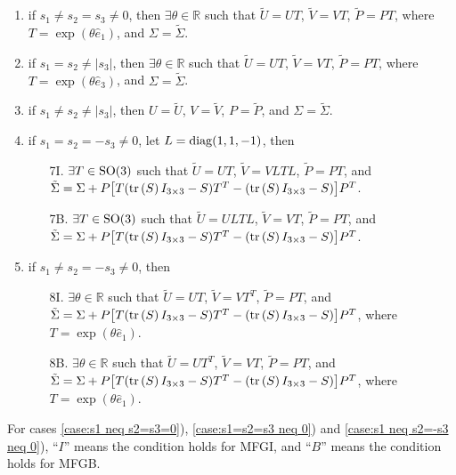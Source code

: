 \begin{theorem}
\begin{enumerate}
		\item if $s_1 \neq s_2=s_3 \neq 0$, then $\exists \theta\in\mathbb{R}$ such that $\tilde{U}=UT$, $\tilde{V}=VT$, $\tilde{P}=PT$, where $T=\exp(\theta\hat{e}_1)$, and $\Sigma=\tilde{\Sigma}$.\label{case:s1 neq s2=s3 neq 0}
		\item if $s_1=s_2 \neq |s_3|$, then $\exists \theta\in\mathbb{R}$ such that $\tilde{U}=UT$, $\tilde{V}=VT$, $\tilde{P}=PT$, where $T=\exp(\theta\hat{e}_3)$, and $\Sigma=\tilde{\Sigma}$.\label{case:s1=s2 neq |s3|}
		\item if $s_1 \neq s_2 \neq |s_3|$, then $U=\tilde{U}$, $V=\tilde{V}$, $P=\tilde{P}$, and $\Sigma=\tilde{\Sigma}$. \label{case:s1 neq s2 neq |s3|}
		\item if $s_1=s_2=-s_3 \neq 0$, let $L = \mathrm{diag}(1,1,-1)$, then \label{case:s1=s2=-s3 neq 0}
		\begin{enumerate}
			\item [7I.] $\exists T\in\mathrm{SO}(3)$ such that $\tilde{U}=UT$, $\tilde{V}=VLTL$, $\tilde{P}=PT$, and \linebreak $\tilde{\Sigma} = \Sigma + P\big[T(\mathrm{tr}\left( S \right)I_{3\times 3}-S)T^T - (\mathrm{tr}\left( S \right)I_{3\times 3}-S)\big]P^T$.
			\item [7B.] $\exists T\in\mathrm{SO}(3)$ such that  $\tilde{U}=ULTL$, $\tilde{V}=VT$, $\tilde{P}=PT$, and \linebreak $\tilde{\Sigma} = \Sigma + P\big[ T(\mathrm{tr}\left( S \right)I_{3\times 3}-S)T^T - (\mathrm{tr}\left( S \right)I_{3\times 3}-S) \big]P^T$.
		\end{enumerate}
		\item if $s_1 \neq s_2=-s_3 \neq 0$, then \label{case:s1 neq s2=-s3 neq 0}
		\begin{enumerate}
			\item [8I.] $\exists \theta\in\mathbb{R}$ such that $\tilde{U}=UT$, $\tilde{V}=VT^T$, $\tilde{P}=PT$, and $\tilde{\Sigma} = \Sigma + P\big[ T(\mathrm{tr}\left( S \right)I_{3\times 3}-S)T^T - (\mathrm{tr}\left( S \right)I_{3\times 3}-S) \big]P^T$, where $T=\exp(\theta\hat{e}_1)$.
			\item [8B.] $\exists \theta\in\mathbb{R}$ such that $\tilde{U}=UT^T$, $\tilde{V}=VT$, $\tilde{P}=PT$, and $\tilde{\Sigma} = \Sigma + P\big[ T(\mathrm{tr}\left( S \right)I_{3\times 3}-S)T^T - (\mathrm{tr}\left( S \right)I_{3\times 3}-S) \big]P^T$, where $T=\exp(\theta\hat{e}_1)$.
		\end{enumerate}
	\end{enumerate}
	For cases \ref{case:s1 neq s2=s3=0}), \ref{case:s1=s2=s3 neq 0}) and \ref{case:s1 neq s2=-s3 neq 0}), ``$I$'' means the condition holds for MFGI, and ``$B$'' means the condition holds for MFGB.
\end{theorem}
